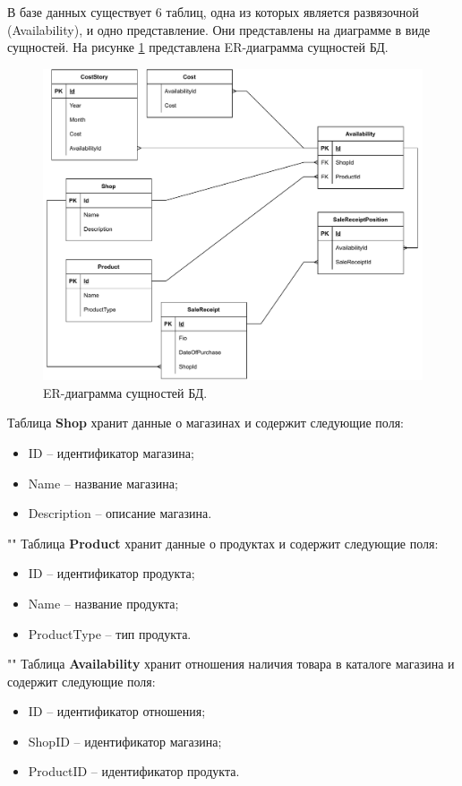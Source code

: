 \documentclass[a4paper,14pt]{extreport}
\begin{document}
В базе данных существует 6 таблиц, одна из которых является развязочной (Availability), и одно представление. Они представлены на диаграмме в виде сущностей. На рисунке \ref{db} представлена ER-диаграмма сущностей БД.

\begin{figure}[H]
	\centering
	\includegraphics[scale=0.8]{ER-DB.drawio.pdf}
	\caption{ER-диаграмма сущностей БД.}
	\label{db}
\end{figure}

Таблица \textbf{Shop} хранит данные о магазинах и содержит следующие поля:
\begin{itemize}
	\setlength\itemsep{0.01em}
	\item ID -- идентификатор магазина;
	\item Name -- название магазина;
	\item Description -- описание магазина.
\end{itemize}

""\newline\indent
Таблица \textbf{Product} хранит данные о продуктах и содержит следующие поля:
\begin{itemize}
	\setlength\itemsep{0.01em}
	\item ID -- идентификатор продукта;
	\item Name -- название продукта;
	\item ProductType -- тип продукта.
\end{itemize}

""\newline\indent
Таблица \textbf{Availability} хранит отношения наличия товара в каталоге магазина и содержит следующие поля:
\begin{itemize}
	\setlength\itemsep{0.01em}
	\item ID -- идентификатор отношения;
	\item ShopID -- идентификатор магазина;
	\item ProductID -- идентификатор продукта.
\end{itemize}
\end{document}
